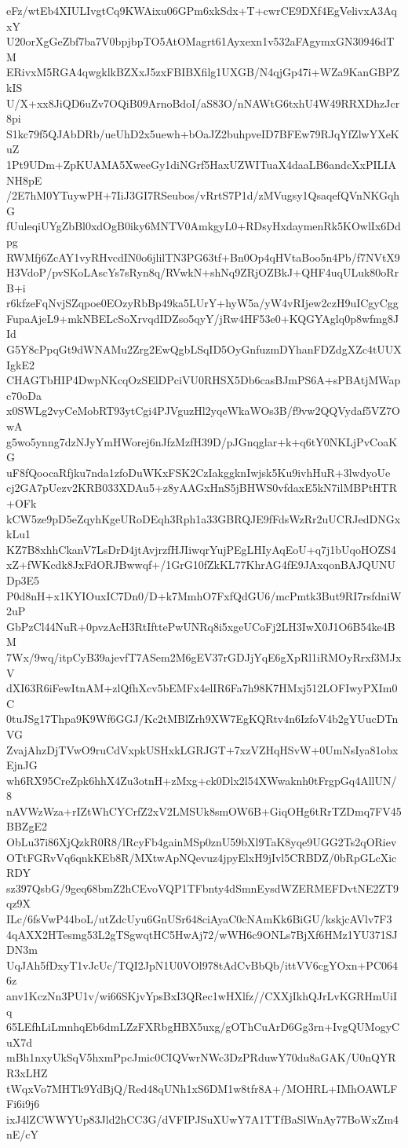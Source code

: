 eFz/wtEb4XIULIvgtCq9KWAixu06GPm6xkSdx+T+cwrCE9DXf4EgVelivxA3AqxY
U20orXgGeZbf7ba7V0bpjbpTO5AtOMagrt61Ayxexn1v532aFAgymxGN30946dTM
ERivxM5RGA4qwgklkBZXxJ5zxFBIBXfilg1UXGB/N4qjGp47i+WZa9KanGBPZkIS
U/X+xx8JiQD6uZv7OQiB09ArnoBdoI/aS83O/nNAWtG6txhU4W49RRXDhzJcr8pi
S1kc79f5QJAbDRb/ueUhD2x5uewh+bOaJZ2buhpveID7BFEw79RJqYfZlwYXeKuZ
1Pt9UDm+ZpKUAMA5XweeGy1diNGrf5HaxUZWITuaX4daaLB6andcXxPILIANH8pE
/2E7hM0YTuywPH+7IiJ3GI7RSeubos/vRrtS7P1d/zMVugsy1QsaqefQVnNKGqhG
fUuleqiUYgZbBl0xdOgB0iky6MNTV0AmkgyL0+RDsyHxdaymenRk5KOwlIx6Ddpg
RWMfj6ZcAY1vyRHvcdIN0o6jlilTN3PG63tf+Bn0Op4qHVtaBoo5n4Pb/f7NVtX9
H3VdoP/pvSKoLAscYs7sRyn8q/RVwkN+shNq9ZRjOZBkJ+QHF4uqULuk80oRrB+i
r6kfzeFqNvjSZqpoe0EOzyRbBp49ka5LUrY+hyW5a/yW4vRIjew2czH9uICgyCgg
FupaAjeL9+mkNBELcSoXrvqdIDZso5qyY/jRw4HF53e0+KQGYAglq0p8wfmg8JId
G5Y8cPpqGt9dWNAMu2Zrg2EwQgbLSqID5OyGnfuzmDYhanFDZdgXZc4tUUXIgkE2
CHAGTbHIP4DwpNKcqOzSElDPciVU0RHSX5Db6casBJmPS6A+sPBAtjMWapc70oDa
x0SWLg2vyCeMobRT93ytCgi4PJVguzHl2yqeWkaWOs3B/f9vw2QQVydaf5VZ7OwA
g5wo5ynng7dzNJyYmHWorej6nJfzMzfH39D/pJGnqglar+k+q6tY0NKLjPvCoaKG
uF8fQoocaRfjku7nda1zfoDuWKxFSK2CzIakggknIwjsk5Ku9ivhHuR+3lwdyoUe
cj2GA7pUezv2KRB033XDAu5+z8yAAGxHnS5jBHWS0vfdaxE5kN7ilMBPtHTR+OFk
kCW5ze9pD5eZqyhKgeURoDEqh3Rph1a33GBRQJE9fFdsWzRr2uUCRJedDNGxkLu1
KZ7B8xhhCkanV7LsDrD4jtAvjrzfHJIiwqrYujPEgLHIyAqEoU+q7j1bUqoHOZS4
xZ+fWKcdk8JxFdORJBwwqf+/1GrG10fZkKL77KhrAG4fE9JAxqonBAJQUNUDp3E5
P0d8nH+x1KYIOuxIC7Dn0/D+k7MmhO7FxfQdGU6/mcPmtk3But9RI7rsfdniW2uP
GbPzCl44NuR+0pvzAcH3RtIfttePwUNRq8i5xgeUCoFj2LH3IwX0J1O6B54ke4BM
7Wx/9wq/itpCyB39ajevfT7ASem2M6gEV37rGDJjYqE6gXpRl1iRMOyRrxf3MJxV
dXI63R6iFewItnAM+zlQfhXcv5bEMFx4elIR6Fa7h98K7HMxj512LOFIwyPXIm0C
0tuJSg17Thpa9K9Wf6GGJ/Kc2tMBlZrh9XW7EgKQRtv4n6IzfoV4b2gYUucDTnVG
ZvajAhzDjTVwO9ruCdVxpkUSHxkLGRJGT+7xzVZHqHSvW+0UmNsIya81obxEjnJG
wh6RX95CreZpk6hhX4Zu3otnH+zMxg+ck0Dlx2l54XWwaknh0tFrgpGq4AllUN/8
nAVWzWza+rIZtWhCYCrfZ2xV2LMSUk8smOW6B+GiqOHg6tRrTZDmq7FV45BBZgE2
ObLu37i86XjQzkR0R8/lRcyFb4gainMSp0znU59bXl9TaK8yqe9UGG2Ts2qORiev
OTtFGRvVq6qnkKEb8R/MXtwApNQevuz4jpyElxH9jIvl5CRBDZ/0bRpGLcXicRDY
sz397QsbG/9geq68bmZ2hCEvoVQP1TFbnty4dSmnEysdWZERMEFDvtNE2ZT9qz9X
ILc/6fsVwP44boL/utZdcUyu6GnUSr648ciAyaC0cNAmKk6BiGU/kskjcAVlv7F3
4qAXX2HTesmg53L2gTSgwqtHC5HwAj72/wWH6c9ONLs7BjXf6HMz1YU371SJDN3m
UqJAh5fDxyT1vJcUc/TQI2JpN1U0VOl978tAdCvBbQb/ittVV6cgYOxn+PC0646z
anv1KczNn3PU1v/wi66SKjvYpsBxI3QRec1wHXlfz//CXXjIkhQJrLvKGRHmUiIq
65LEfhLiLmnhqEb6dmLZzFXRbgHBX5uxg/gOThCuArD6Gg3rn+IvgQUMogyCuX7d
mBh1nxyUkSqV5hxmPpcJmic0CIQVwrNWc3DzPRduwY70du8aGAK/U0nQYRR3xLHZ
tWqxVo7MHTk9YdBjQ/Red48qUNh1xS6DM1w8tfr8A+/MOHRL+IMhOAWLFFi6i9j6
ixJ4lZCWWYUp83Jld2hCC3G/dVFIPJSuXUwY7A1TTfBaSlWnAy77BoWxZm4nE/cY
